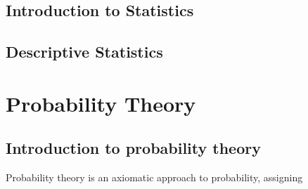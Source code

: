 \documentclass[letterpaper,10pt,english]{jupyterBook}
\begin{document}
\chapter{Introduction to Statistics}
\label{\detokenize{ch/intro/intro:introduction-to-statistics}}\label{\detokenize{ch/intro/intro:intro-intro}}\label{\detokenize{ch/intro/intro::doc}}
\sphinxstepscope


\chapter{Descriptive Statistics}
\label{\detokenize{ch/intro/descriptive:descriptive-statistics}}\label{\detokenize{ch/intro/descriptive:intro-descriptive}}\label{\detokenize{ch/intro/descriptive::doc}}
\sphinxstepscope


\part{Probability Theory}

\sphinxstepscope


\chapter{Introduction to probability theory}
\label{\detokenize{ch/prob/intro:introduction-to-probability-theory}}\label{\detokenize{ch/prob/intro:prob-intro}}\label{\detokenize{ch/prob/intro::doc}}
\sphinxAtStartPar
Probability theory is an axiomatic approach to probability, assigning
\end{document}
